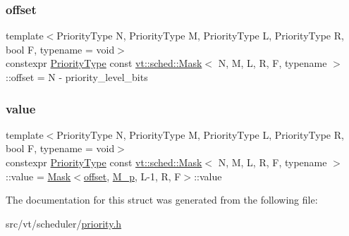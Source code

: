 \mbox{\label{structvt_1_1sched_1_1_mask_ae91f8382806210477762fc109a74fddd}} 
\subsubsection{\texorpdfstring{offset}{offset}}
{\footnotesize\ttfamily template$<$Priority\+Type N, Priority\+Type M, Priority\+Type L, Priority\+Type R, bool F, typename  = void$>$ \\
constexpr \hyperlink{namespacevt_a86bff9f556eb761b27fc8600d006ac04}{Priority\+Type} const \hyperlink{structvt_1_1sched_1_1_mask}{vt\+::sched\+::\+Mask}$<$ N, M, L, R, F, typename $>$\+::offset = N -\/ priority\+\_\+level\+\_\+bits\hspace{0.3cm}{\ttfamily [static]}}

\mbox{\label{structvt_1_1sched_1_1_mask_a754152322550ef1c075cc4ecb702d6cd}} 
\subsubsection{\texorpdfstring{value}{value}}
{\footnotesize\ttfamily template$<$Priority\+Type N, Priority\+Type M, Priority\+Type L, Priority\+Type R, bool F, typename  = void$>$ \\
constexpr \hyperlink{namespacevt_a86bff9f556eb761b27fc8600d006ac04}{Priority\+Type} const \hyperlink{structvt_1_1sched_1_1_mask}{vt\+::sched\+::\+Mask}$<$ N, M, L, R, F, typename $>$\+::value = \hyperlink{structvt_1_1sched_1_1_mask}{Mask}$<$\hyperlink{structvt_1_1sched_1_1_mask_ae91f8382806210477762fc109a74fddd}{offset}, \hyperlink{structvt_1_1sched_1_1_mask_a3949a195768183b0086b582bdc8855d2}{M\+\_\+p}, L-\/1, R, F$>$\+::value\hspace{0.3cm}{\ttfamily [static]}}



The documentation for this struct was generated from the following file\+:\begin{DoxyCompactItemize}
\item 
src/vt/scheduler/\hyperlink{priority_8h}{priority.\+h}\end{DoxyCompactItemize}
